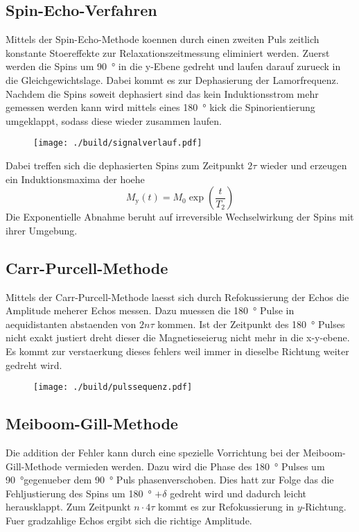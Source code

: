 \subsection{Spin-Echo-Verfahren}%
\label{sub:spin_echo_verfahren}
Mittels der Spin-Echo-Methode koennen durch einen zweiten Puls zeitlich
konstante Stoereffekte zur Relaxationszeitmessung eliminiert werden. 
Zuerst werden die Spins um \SI{90}{\degree} in die y-Ebene gedreht und laufen
darauf zurueck in die Gleichgewichtslage.
Dabei kommt es zur Dephasierung der Lamorfrequenz. 
Nachdem die Spins soweit dephasiert sind das kein Induktionsstrom mehr gemessen
werden kann wird mittels eines \SI{180}{\degree} kick die Spinorientierung umgeklappt, 
sodass diese wieder zusammen laufen.
\begin{figure}[h]
		\centering
		\texttt{[image: ./build/signalverlauf.pdf]}
		\caption{}
		\label{fig:sign}
\end{figure}
Dabei treffen sich die dephasierten Spins zum Zeitpunkt $2 \tau$ wieder und
erzeugen ein Induktionsmaxima der hoehe 
\begin{equation}
		\label{eq:}
		M_\text{y}(t) = M_0 \exp\left( \frac{t}{T_2} \right)
\end{equation}
Die Exponentielle Abnahme beruht auf irreversible Wechselwirkung der Spins mit
ihrer Umgebung. 

\subsection{Carr-Purcell-Methode}%
\label{sub:car_purcell}
Mittels der Carr-Purcell-Methode laesst sich durch Refokussierung der Echos die
Amplitude meherer Echos messen. 
Dazu muessen die \SI{180}{\degree} Pulse in aequidistanten abstaenden von $2n\tau$
kommen. 
Ist der Zeitpunkt des \SI{180}{\degree} Pulses nicht exakt justiert dreht dieser die
Magnetieseierug nicht mehr in die x-y-ebene. 
Es kommt zur verstaerkung dieses fehlers weil immer in dieselbe Richtung weiter
gedreht wird.

\begin{figure}[ht]
		\centering
		\texttt{[image: ./build/pulssequenz.pdf]}
		\caption{}
		\label{fig:}
\end{figure}

\subsection{Meiboom-Gill-Methode}%
\label{sub:meiboom_gill_methode}
Die addition der Fehler kann durch eine spezielle Vorrichtung bei der
Meiboom-Gill-Methode vermieden werden.
Dazu wird die Phase des \SI{180}{\degree} Pulses um \SI{90}{\degree}gegenueber
dem \SI{90}{\degree} Puls phasenverschoben.
Dies hatt zur Folge das die Fehljustierung des Spins um \SI{180}{\degree} 
$+ \delta$ gedreht wird und dadurch leicht herausklappt. 
Zum Zeitpunkt $n \cdot 4 \tau$ kommt es zur Refokussierung in $y$-Richtung.
Fuer gradzahlige Echos ergibt sich die richtige Amplitude.

